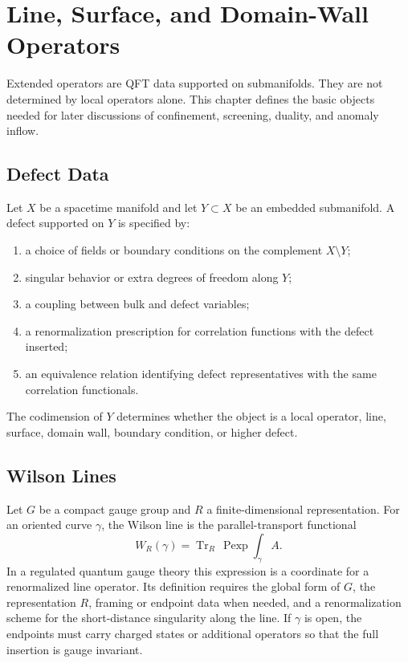 \chapter{Line, Surface, and Domain-Wall Operators}
\label{ch:global-line-surface-domain-wall-operators}

\ConventionsMixed

Extended operators are QFT data supported on submanifolds.  They are not
determined by local operators alone.  This chapter defines the basic objects
needed for later discussions of confinement, screening, duality, and anomaly
inflow.

\section{Defect Data}

Let \(X\) be a spacetime manifold and let \(Y\subset X\) be an embedded
submanifold.  A defect supported on \(Y\) is specified by:
\begin{enumerate}[label=(\roman*)]
\item a choice of fields or boundary conditions on the complement
  \(X\setminus Y\);
\item singular behavior or extra degrees of freedom along \(Y\);
\item a coupling between bulk and defect variables;
\item a renormalization prescription for correlation functions with the
  defect inserted;
\item an equivalence relation identifying defect representatives with the
  same correlation functionals.
\end{enumerate}
The codimension of \(Y\) determines whether the object is a local operator,
line, surface, domain wall, boundary condition, or higher defect.

\section{Wilson Lines}

Let \(G\) be a compact gauge group and \(R\) a finite-dimensional
representation.  For an oriented curve \(\gamma\), the Wilson line is the
parallel-transport functional
\[
  W_R(\gamma)=
  \operatorname{Tr}_R\,\operatorname{Pexp}
  \int_\gamma A .
\]
In a regulated quantum gauge theory this expression is a coordinate for a
renormalized line operator.  Its definition requires the global form of
\(G\), the representation \(R\), framing or endpoint data when needed, and a
renormalization scheme for the short-distance singularity along the line.
If \(\gamma\) is open, the endpoints must carry charged states or additional
operators so that the full insertion is gauge invariant.

